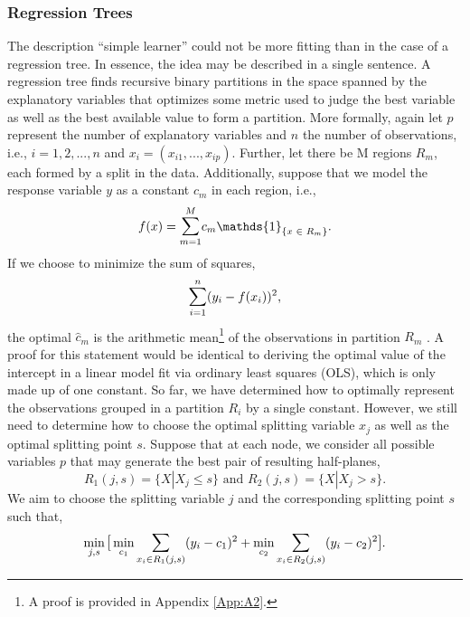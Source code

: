 \documentclass[a4paper,12pt, headsepline]{scrartcl}
\DeclareMathOperator*{\minA}{min}
\numberwithin{equation}{section}
\begin{document}
\subsubsection{Regression Trees}\label{subsubsec:trees}
The description \enquote{simple learner} could not be more fitting than in the case of a regression tree. In essence, the idea may be described in a single sentence. A regression tree finds recursive binary partitions in the space spanned by the explanatory variables that optimizes some metric used to judge the best variable as well as the best available value to form a partition. More formally, again let $p$ represent the number of explanatory variables and $n$ the number of observations, i.e., $i = 1, 2, ..., n$ and $x_i = (x_{i1}, ..., x_{ip})$. Further, let there be M regions $R_m$, each formed by a split in the data. Additionally, suppose that we model the response variable $y$ as a constant $c_m$ in each region, i.e.,
\[
f(x) = \mathlarger{\sum}\limits_{m = 1}^{M} c_m \mathds{1}_{\{x \text{ } \in \text{ } R_m\}}.
\]
If we choose to minimize the sum of squares, 
\[
\mathlarger{\sum}\limits_{i = 1}^{n}(y_i - f(x_i))^2,
\]
the optimal $\hat c_m$ is the arithmetic mean\footnote{A proof is provided in Appendix \ref{App:A2}.} of the observations in partition $R_m$ \citep{hastie09}. A proof for this statement would be identical to deriving the optimal value of the intercept in a linear model fit via ordinary least squares (OLS), which is only made up of one constant. So far, we have determined how to optimally represent the observations grouped in a partition $R_i$ by a single constant. However, we still need to determine how to choose the optimal splitting variable $x_j$ as well as the optimal splitting point $s$. Suppose that at each node, we consider all possible variables $p$ that may generate the best pair of resulting half-planes,
\[
R_1(j, s) = \{X|X_j \leq s\} \text{ and } R_2(j, s) = \{X|X_j > s\}.
\]
We aim to choose the splitting variable $j$ and the corresponding splitting point $s$ such that,
\[
\minA_{j, s}\mathlarger{[} \minA_{c_1} \mathlarger{\sum}\limits_{x_i \in R_1(j, s)} (y_i - c_1)^2 + \minA_{c_2} \mathlarger{\sum}\limits_{x_i \in R_2(j, s)} (y_i - c_2)^2 \mathlarger{]}.
\]
\end{document}
